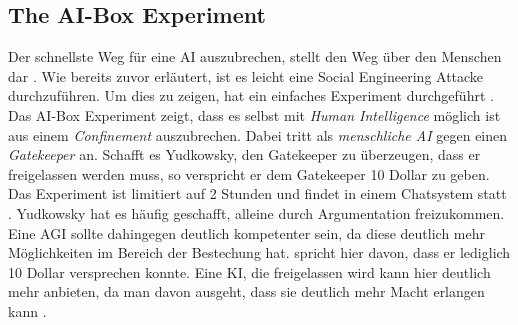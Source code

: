         \subsection{The AI-Box Experiment}
        Der schnellste Weg für eine AI auszubrechen, stellt den Weg über den Menschen dar \cite[s. 306]{armstrongforthcoming}.
        Wie bereits zuvor erläutert, ist es leicht eine Social Engineering Attacke durchzuführen. Um dies zu zeigen, hat
        \citeauthor{yudkowsky_2002} ein einfaches Experiment durchgeführt \citeyearpar{yudkowsky_2002}. Das AI-Box Experiment
        zeigt, dass es selbst mit \textit{Human Intelligence} möglich ist aus einem \textit{Confinement} auszubrechen.
        Dabei tritt \citeauthor{yudkowsky_2002} als \textit{menschliche AI} gegen einen \textit{Gatekeeper} an. Schafft
        es Yudkowsky, den Gatekeeper zu überzeugen, dass er freigelassen werden muss, so verspricht er dem Gatekeeper
        10 Dollar zu geben. Das Experiment ist limitiert auf 2 Stunden und findet in einem Chatsystem statt \cite{yudkowsky_2002}.
        Yudkowsky hat es häufig geschafft, alleine durch Argumentation freizukommen. Eine AGI sollte dahingegen deutlich
        kompetenter sein, da diese deutlich mehr Möglichkeiten im Bereich der Bestechung hat. \citeauthor{yudkowsky_2002}
        spricht hier davon, dass er lediglich 10 Dollar versprechen konnte. Eine KI, die freigelassen wird kann hier
        deutlich mehr anbieten, da man davon ausgeht, dass sie deutlich mehr Macht erlangen kann \citeyearpar{yudkowsky_2002}.

